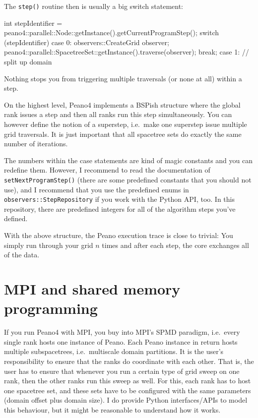 The \texttt{step()} routine then is usually a big switch statement:
\begin{code}
int stepIdentifier = peano4::parallel::Node::getInstance().getCurrentProgramStep();
switch (stepIdentifier) {
  case 0:
    {
      observers::CreateGrid  observer;
      peano4::parallel::SpacetreeSet::getInstance().traverse(observer);
    }
    break;
  case 1:
    {
      // split up domain
    }
}
\end{code}


\noindent
Nothing stops you from triggering multiple traversals (or none at all) within a
step.


\begin{remark}
 On the highest level, Peano4 implements a BSPish structure where the global
 rank issues a step and then all ranks run this step simultaneously. You can
 however define the notion of a superstep, i.e.~make one superstep issue
 multiple grid traversals. It is just important that all spacetree sets do
 exactly the same number of iterations.
\end{remark}


\noindent
The numbers within the case statements are kind of magic constants and you can
redefine them. 
However, I recommend to read the documentation of \texttt{setNextProgramStep()}
(there are some predefined constants that you should not use), and I recommend
that you use the predefined enums in \texttt{observers::StepRepository} if you
work with the Python API, too.
In this repository, there are predefined integers for all of the algorithm steps
you've defined. 


With the above structure, the Peano execution trace is close to trivial:
You simply run through your grid $n$ times and after each step, the core
exchanges all of the data.


\section{MPI and shared memory programming}

If you run Peano4 with MPI, you buy into MPI's SPMD paradigm, i.e.~every single
rank hosts one instance of Peano.
Each Peano instance in return hosts multiple subspacetrees, i.e.~multiscale
domain partitions.
It is the user's responsibility to ensure that the ranks do coordinate with each
other.
That is, the user has to ensure that whenever you run a certain type of grid
sweep on one rank, then the other ranks run this sweep as well.
For this, each rank has to host one spacetree set, and these sets have to be
configured with the same parameters (domain offset plus domain size).
I do provide Python interfaces/APIs to model this behaviour, but it might be
reasonable to understand how it works.



